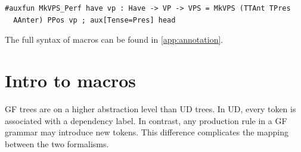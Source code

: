 





\begin{verbatim}
#auxfun MkVPS_Perf have vp : Have -> VP -> VPS = MkVPS (TTAnt TPres 
  AAnter) PPos vp ; aux[Tense=Pres] head
\end{verbatim}

The full syntax of macros can be found in \autoref{app:annotation}.

\section{Intro to macros}


GF trees are on a higher abstraction level than UD trees. In UD, every token is associated with a dependency label. In contrast, any production rule in a GF grammar may introduce new tokens. This difference complicates the mapping between the two formalisms.


